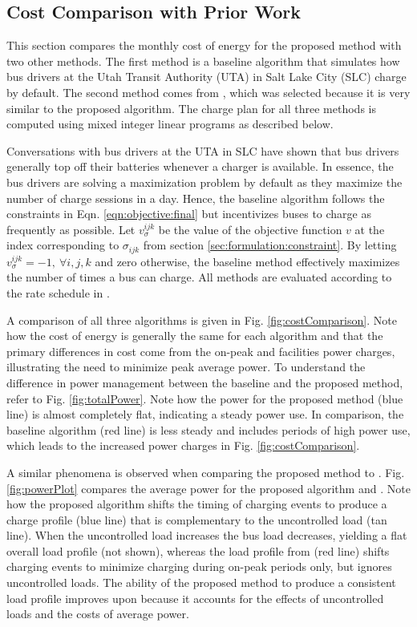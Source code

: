 \subsection{Cost Comparison with Prior Work\label{sec:results:prior}} 
This section compares the monthly cost of energy for the proposed method with two other methods. The first method is a baseline algorithm that simulates how bus drivers at the Utah Transit Authority (UTA) in Salt Lake City (SLC) charge by default. The second method comes from \cite{He_2019_Fast}, which was selected because it is very similar to the proposed algorithm. The charge plan for all three methods is computed using mixed integer linear programs as described below.  
\par Conversations with bus drivers at the UTA in SLC have shown that bus drivers generally top off their batteries whenever a charger is available. In essence, the bus drivers are solving a maximization problem by default as they maximize the number of charge sessions in a day. Hence, the baseline algorithm follows the constraints in Eqn. \eqref{eqn:objective:final} but incentivizes buses to charge as frequently as possible. Let $v_{\sigma}^{ijk}$ be the value of the objective function $v$ at the index corresponding to $\sigma_{ijk}$ from section \ref{sec:formulation:constraint}. By letting $v^{ijk}_{\sigma} = -1, \ \forall i,j,k$ and zero otherwise, the baseline method effectively maximizes the number of times a bus can charge.  
 All methods are evaluated according to the rate schedule in \cite{rocky_mountain_power_rocky_2021}. 
 \par A comparison of all three algorithms is given in Fig. \ref{fig:costComparison}. Note how the cost of energy is generally the same for each algorithm and that the primary differences in cost come from the on-peak and facilities power charges, illustrating the need to minimize peak average power. To understand the difference in power management between the baseline and the proposed method, refer to Fig. \ref{fig:totalPower}. Note how the power for the proposed method (blue line) is almost completely flat, indicating a steady power use. In comparison, the baseline algorithm (red line) is less steady and includes periods of high power use, which leads to the increased power charges in Fig. \ref{fig:costComparison}.
 \par A similar phenomena is observed when comparing the proposed method to \cite{He_2019_Fast}. Fig. \ref{fig:powerPlot} compares the average power for the proposed algorithm and \cite{He_2019_Fast}.  Note how the proposed algorithm shifts the timing of charging events to produce a charge profile (blue line) that is complementary to the uncontrolled load (tan line).  When the uncontrolled load increases the bus load decreases, yielding a flat overall load profile (not shown), whereas the load profile from \cite{He_2019_Fast} (red line) shifts charging events to minimize charging during on-peak periods only, but ignores uncontrolled loads. The ability of the proposed method to produce a consistent load profile improves upon \cite{He_2019_Fast} because it accounts for the effects of uncontrolled loads and the costs of average power.  


 

